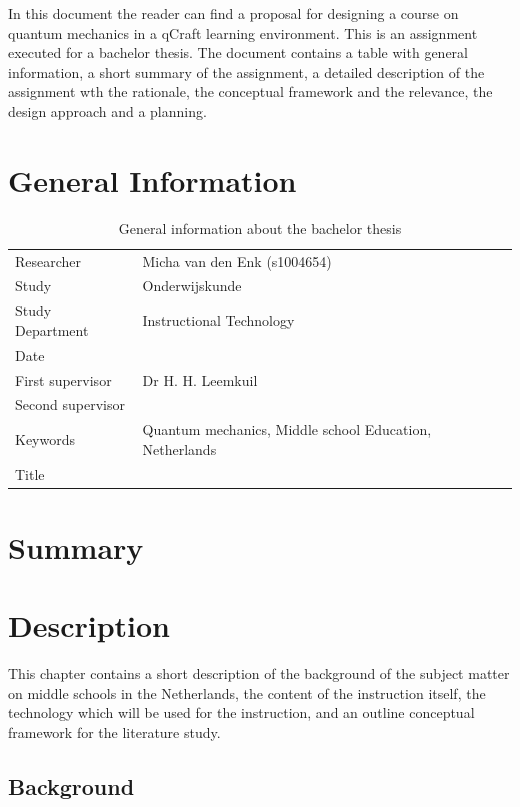 \documentclass[12pt]{report} %
\begin{document}
In this document the reader can find a proposal for designing a course on quantum mechanics in a qCraft learning environment. This is an assignment executed for a bachelor thesis. The document contains a table with general information, a short summary of the assignment, a detailed description of the assignment wth the rationale, the conceptual framework and the relevance, the design approach and a planning.

\chapter{General Information}

\begin{table}[h]
\begin{center}
\begin{tabular}{ l p{8cm} }
Researcher & Micha van den Enk (s1004654) \\
Study & Onderwijskunde \\
Study Department & Instructional Technology \\ 
Date & \\
First supervisor & Dr H. H. Leemkuil \\
Second supervisor & \\
Keywords & Quantum mechanics, Middle school Education, Netherlands \\
Title & \\
\end{tabular}
\end{center}
\caption{\footnotesize General information about the bachelor thesis}
\end{table}

\chapter{Summary}

\chapter{Description}

This chapter contains a short description of the background of the subject matter on middle schools in the Netherlands, the content of the instruction itself, the technology which will be used for the instruction, and an outline conceptual framework for the literature study.

\section{Background}
\end{document}
